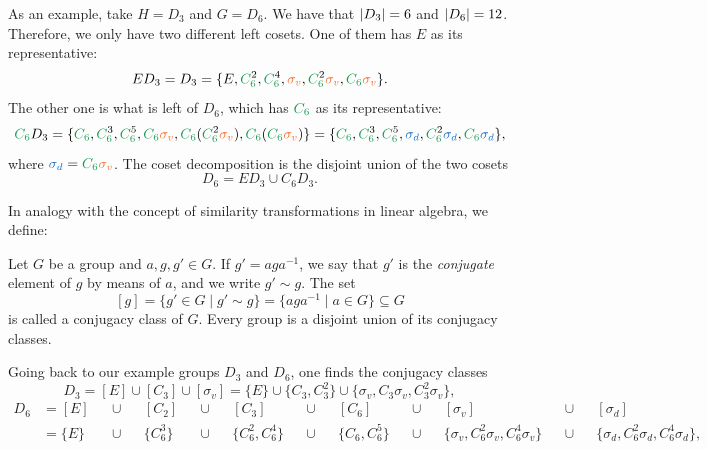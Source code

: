 As an example, take $H = D_3$ and $G = D_6$. We have that $\abs{D_3}=6$ and $\abs{D_6} = 12$. Therefore, we only have two different left cosets. One of them has $E$ as its representative:
$$
E D_3 = D_3 = \{E, \textcolor{ForestGreen}{C_6^{\textcolor{black}{2}}}, \textcolor{ForestGreen}{C_6^{\textcolor{black}{4}}}, \textcolor{Orange}{\sigma_v}, \textcolor{ForestGreen}{C_6^{\textcolor{black}{2}}} \textcolor{Orange}{\sigma_v}, \textcolor{ForestGreen}{C_6} \textcolor{Orange}{\sigma_v} \}.
$$
The other one is what is left of $D_6$, which has $\textcolor{ForestGreen}{C_6}$ as its representative:
$$
\textcolor{ForestGreen}{C_6} D_3 = \{\textcolor{ForestGreen}{C_6}, \textcolor{ForestGreen}{C_6^{\textcolor{black}{3}}}, \textcolor{ForestGreen}{C_6^{\textcolor{black}{5}}}, \textcolor{ForestGreen}{C_6}\textcolor{Orange}{\sigma_v}, \textcolor{ForestGreen}{C_6} (\textcolor{ForestGreen}{C_6^{\textcolor{black}{2}}} \textcolor{Orange}{\sigma_v}), \textcolor{ForestGreen}{C_6}(\textcolor{ForestGreen}{C_6} \textcolor{Orange}{\sigma_v}) \} = \{ \textcolor{ForestGreen}{C_6}, \textcolor{ForestGreen}{C_6^{\textcolor{black}{3}}}, \textcolor{ForestGreen}{C_6^{\textcolor{black}{5}}}, \textcolor{RoyalBlue}{\sigma_d}, \textcolor{ForestGreen}{C_6^{\textcolor{black}{2}}} \textcolor{RoyalBlue}{\sigma_d}, \textcolor{ForestGreen}{C_6} \textcolor{RoyalBlue}{\sigma_d} \},
$$
where $\textcolor{RoyalBlue}{\sigma_d} = \textcolor{ForestGreen}{C_6}\textcolor{Orange}{\sigma_v}$. The coset decomposition is the disjoint union of the two cosets
$$
D_6 = ED_3 \cup C_6 D_3.
$$

In analogy with the concept of similarity transformations in linear algebra, we define:
\begin{definition}
Let $G$ be a group and $a, g, g' \in G$. If $g' = a g a^{-1}$, we say that $g'$ is the \textit{conjugate} element of $g$ by means of $a$, and we write $g' \sim g$. The set
$$
[g] = \{ g' \in G \mid g' \sim g \} = \{ a g a^{-1} \mid a \in G \} \subseteq G
$$
is called a conjugacy class of $G$. Every group is a disjoint union of its conjugacy classes.
\end{definition}

Going back to our example groups $D_3$ and $D_6$, one finds the conjugacy classes
$$
D_3 = [E] \cup [C_3] \cup [\sigma_v] = \{E\} \cup \{C_3, C_3^2\} \cup \{\sigma_v, C_3 \sigma_v, C_3^2 \sigma_v\},
$$
\begin{align*}
D_6 &= [E] &&\cup&& [C_2] &&\cup&& [C_3] &&\cup&& [C_6] &&\cup&& [\sigma_v] &&\cup&& [\sigma_d] \\
&= \{E\} &&\cup&& \{C_6^3\} &&\cup&& \{C_6^2, C_6^4\} &&\cup&& \{C_6, C_6^5\} &&\cup&& \{\sigma_v, C_6^2 \sigma_v, C_6^4 \sigma_v\} &&\cup&& \{\sigma_d, C_6^2 \sigma_d, C_6^4 \sigma_d\},
\end{align*}

